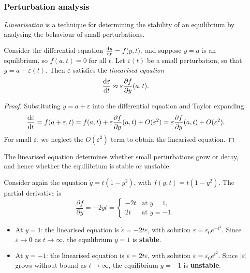 \documentclass[a4paper]{article}
\begin{document}
\subsubsection{Perturbation analysis}
\begin{defi}[Linearisation]
  \emph{Linearisation} is a technique for determining the stability of an equilibrium by analysing the behaviour of small perturbations.
\end{defi}

\begin{prop}
  Consider the differential equation $\frac{\mathrm{d} y}{\mathrm{d} t} = f(y, t)$, and suppose $y = a$ is an equilibrium, so $f(a, t) = 0$ for all $t$. Let $\varepsilon(t)$ be a small perturbation, so that $y = a + \varepsilon(t)$. Then $\varepsilon$ satisfies the \emph{linearised equation}
  \[
    \frac{\mathrm{d} \varepsilon}{\mathrm{d} t} \approx \varepsilon\frac{\partial f}{\partial y}(a, t).
  \]
\end{prop}
\begin{proof}
  Substituting $y = a + \varepsilon$ into the differential equation and Taylor expanding:
  \[
    \frac{\mathrm{d} \varepsilon}{\mathrm{d} t} = f(a + \varepsilon, t) = f(a, t) + \varepsilon\frac{\partial f}{\partial y}(a, t) + O(\varepsilon^2) = \varepsilon\frac{\partial f}{\partial y}(a, t) + O(\varepsilon^2).
  \]
  For small $\varepsilon$, we neglect the $O(\varepsilon^2)$ term to obtain the linearised equation.
\end{proof}

\begin{remark}
  The linearised equation determines whether small perturbations grow or decay, and hence whether the equilibrium is stable or unstable.
\end{remark}
\begin{eg}[Linearisation for $\dot{y} = t(1 - y^2)$]
  Consider again the equation $\dot{y} = t(1 - y^2)$, with $f(y, t) = t(1 - y^2)$. The partial derivative is
  \[
    \frac{\partial f}{\partial y} = -2yt =
    \begin{cases}
      -2t & \text{at } y = 1,\\
      2t & \text{at } y = -1.
    \end{cases}
  \]
  \begin{itemize}
    \item At $y = 1$: the linearised equation is $\dot{\varepsilon} = -2t\varepsilon$, with solution $\varepsilon = \varepsilon_0 e^{-t^2}$. Since $\varepsilon \to 0$ as $t \to \infty$, the equilibrium $y = 1$ is \textbf{stable}.
    \item At $y = -1$: the linearised equation is $\dot{\varepsilon} = 2t\varepsilon$, with solution $\varepsilon = \varepsilon_0 e^{t^2}$. Since $|\varepsilon|$ grows without bound as $t \to \infty$, the equilibrium $y = -1$ is \textbf{unstable}.
  \end{itemize}
\end{eg}
\end{document}
